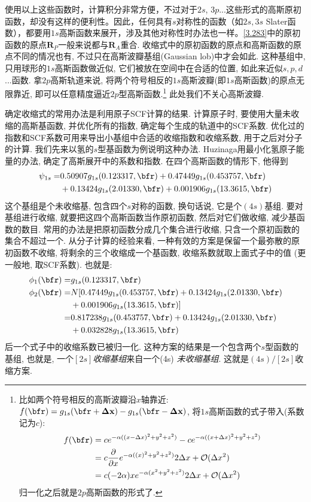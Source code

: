使用以上这些函数时，计算积分非常方便，不过对于$2s$, $3p$...这些形式的高斯原初函数，却没有这样的便利性。因此，任何具有$s$对称性的函数（如$2s,3s$ Slater函数），都要用$1s$高斯函数来展开，涉及其他对称性时办法也一样。\eqref{3.283}中的原初函数的原点$\mathbf{R}_P$一般来说都与$\mathbf{R}_A$重合. 收缩式中的原初函数的原点和高斯函数的原点不同的情况也有, 不过只在高斯波瓣基组(Gaussian lob)中才会如此. 这种基组中, 只用球形的$1s$高斯函数做近似, 它们被放在空间中在合适的位置, 如此来近似$s,p,d$...函数. 拿$2p$高斯轨道来说, 将两个符号相反的$1s$高斯波瓣(即$1s$高斯函数)的原点无限靠近, 即可以任意精度逼近$2p$型高斯函数.\footnote{
比如两个符号相反的高斯波瓣沿$x$轴靠近: $f(\bfr)=g_{1s}(\bfr+\mathbf{\Delta x})-g_{1s}(\bfr-\mathbf{\Delta x})$, 将$1s$高斯函数的式子带入(系数记为$c$):
\begin{align*}
f(\bfr) & = ce^{-\alpha((x-\Delta x)^2+y^2+z^2)}-
ce^{-\alpha((x+\Delta x)^2+y^2+z^2)}\\
        & = c\frac{\partial}{\partial x}e^{-\alpha((x)^2+y^2+z^2)}2\Delta x +\mathcal{O}(\Delta x^2)\\
        & = c(-2\alpha) xe^{-\alpha(x^2+y^2+z^2)}2\Delta x +\mathcal{O}(\Delta x^2)
\end{align*}
归一化之后就是$2p$高斯函数的形式了.
}
此处我们不关心高斯波瓣.

确定收缩式的常用办法是利用原子SCF计算的结果. 计算原子时, 要使用大量未收缩的高斯基函数, 并优化所有的指数, 确定每个生成的轨道中的SCF系数. 优化过的指数和SCF系数可用来导出小基组中合适的收缩指数和收缩系数, 用于之后对分子的计算. 我们先来以氢的$s$型基函数为例说明这种办法. Huzinaga用最小化氢原子能量的办法, 确定了高斯展开中的系数和指数. 在四个高斯函数的情形下, 他得到
\begin{align}
\psi_{1s} = &   0.50907g_{1s}(0.123317,\bfr) + 0.47449 g_{1s}(0.453757,\bfr) \notag\\
            & + 0.13424 g_{1s}(2.01330,\bfr) + 0.001906 g_{1s}(13.3615,\bfr)
\end{align}
这个基组是个未收缩基, 包含四个$s$对称的函数, 换句话说, 它是个$(4s)$基组. 要对基组进行收缩, 就要把这四个高斯函数当作原初函数, 然后对它们做收缩, 减少基函数的数目. 常用的办法是把原初函数分成几个集合进行收缩, 只含一个原初函数的集合不超过一个. 从分子计算的经验来看, 一种有效的方案是保留一个最弥散的原初函数不收缩, 将剩余的三个收缩成一个基函数, 收缩系数就取上面式子中的值 (更一般地, 取SCF系数). 也就是:
\begin{align}
\phi_1(\bfr) = & g_{1s}(0.123317,\bfr)\\
\phi_2(\bfr) = & N[0.47449g_{1s}(0.453757,\bfr)+ 0.13424 g_{1s}(2.01330,\bfr) \notag\\
             & + 0.001906 g_{1s}(13.3615,\bfr)] \notag\\
             = & 0.817238g_{1s}(0.453757,\bfr)+ 0.13424 g_{1s}(2.01330,\bfr) \notag\\
             & +0.032828 g_{1s}(13.3615,\bfr)
\end{align}
后一个式子中的收缩系数已被归一化. 这种方案的结果是一个包含两个$s$型函数的基组, 也就是, 一个\emph{$[2s]$收缩基组}来自一个(4s) \emph{未收缩基组}. 这就是$(4s)/[2s]$收缩方案.

